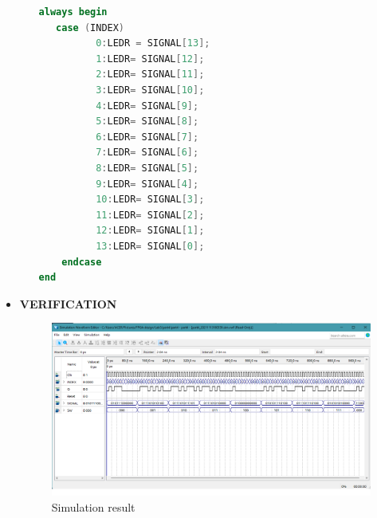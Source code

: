 \begin{itemize}
\begin{itemize}
\begin{lstlisting}[language=verilog]
always begin
   case (INDEX)
          0:LEDR = SIGNAL[13];
          1:LEDR= SIGNAL[12];
          2:LEDR= SIGNAL[11];
          3:LEDR= SIGNAL[10];
          4:LEDR= SIGNAL[9];
          5:LEDR= SIGNAL[8];
          6:LEDR= SIGNAL[7];
          7:LEDR= SIGNAL[6];
          8:LEDR= SIGNAL[5];
          9:LEDR= SIGNAL[4];
          10:LEDR= SIGNAL[3];
          11:LEDR= SIGNAL[2];
          12:LEDR= SIGNAL[1];
          13:LEDR= SIGNAL[0];
    endcase
end
                \end{lstlisting}
        \end{itemize}
    \item []\textbf{VERIFICATION}
        \begin{figure}[h]
            \centering
            \includegraphics[scale = 0.5]{source/picture/Lab7/bai7.png}
            \caption{Simulation result}
        \end{figure}
\end{itemize}

\clearpage